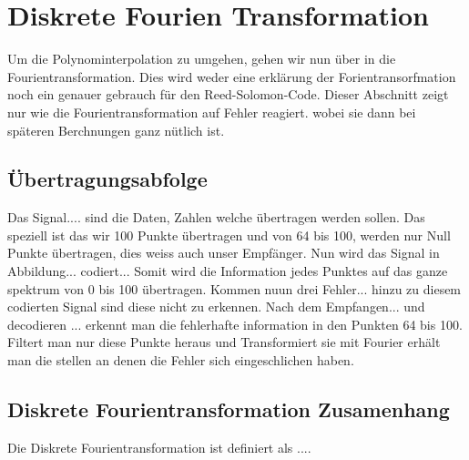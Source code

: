 %
%
%
\section{Diskrete Fourien Transformation
\label{reedsolomon:section:dtf}}
Um die Polynominterpolation zu umgehen, gehen wir nun über in die Fourientransformation.
Dies wird weder eine erklärung der Forientransorfmation noch ein genauer gebrauch
für den Reed-Solomon-Code. Dieser Abschnitt zeigt nur wie die Fourientransformation auf Fehler reagiert.
wobei sie dann bei späteren Berchnungen ganz nütlich ist.

\subsection{Übertragungsabfolge
\label{reedsolomon:subsection:Übertragungsabfolge}}
Das Signal.... sind die Daten, Zahlen welche übertragen werden sollen.
Das speziell ist das wir 100 Punkte übertragen und von 64 bis 100,
werden nur Null Punkte übertragen, dies weiss auch unser Empfänger.
Nun wird das Signal in Abbildung... codiert...
Somit wird die Information jedes Punktes auf das ganze spektrum von 0 bis 100 übertragen.
Kommen nuun drei Fehler... hinzu zu diesem codierten Signal sind diese nicht zu erkennen.
Nach dem Empfangen... und decodieren ... erkennt man die fehlerhafte information in den Punkten 64 bis 100.
Filtert man nur diese Punkte heraus und Transformiert sie mit Fourier erhält man die stellen an denen die Fehler sich eingeschlichen haben.

\subsection{Diskrete Fourientransformation Zusamenhang
\label{reedsolomon:subsection:dtfzusamenhang}}
Die Diskrete Fourientransformation ist definiert als
....


